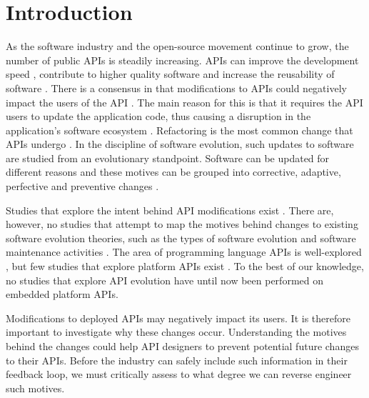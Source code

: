 \documentclass{sig-alternate}
\begin{document}



\section{Introduction} \label{introduction}
As the software industry and the open-source movement continue to grow, the number of public APIs is steadily increasing. APIs can improve the development speed \cite{stylos2006comparing}, contribute to higher quality software \cite{stylos2006comparing} and increase the reusability of software \cite{afonso2012evaluating}. There is a consensus in that modifications to APIs could negatively impact the users of the API \cite{google_talk} \cite{mcdonnell2013empirical} \cite{robbes2012developers} \cite{henning2007api}. The main reason for this is that it requires the API users to update the application code, thus causing a disruption in the application's software ecosystem \cite{messerschmitt2005software}. Refactoring is the most common change that APIs undergo \cite{dig2005role} \cite{xing2006refactoring}. 
In the discipline of software evolution, such updates to software are studied from an evolutionary standpoint. Software can be updated for different reasons and these motives can be grouped into corrective, adaptive, perfective and preventive changes \cite{lientz1980software}. 

Studies that explore the intent behind API modifications exist \cite{hou2011exploring}. There are, however, no studies that attempt to map the motives behind changes to existing software evolution theories, such as the types of software evolution and software maintenance activities \cite{chapin2001types}. The area of programming language APIs is well-explored \cite{hou2011exploring} \cite{shi2011empirical}, but few studies that explore platform APIs exist \cite{robbes2012developers}. To the best of our knowledge, no studies that explore API evolution have until now been performed on embedded platform APIs. 

Modifications to deployed APIs may negatively impact its users. It is therefore important to investigate why these changes occur. Understanding the motives behind the changes could help API designers to  prevent potential future changes to their APIs. Before the industry can safely include such information in their feedback loop, we must critically assess to what degree we can reverse engineer such motives. 
\end{document}
